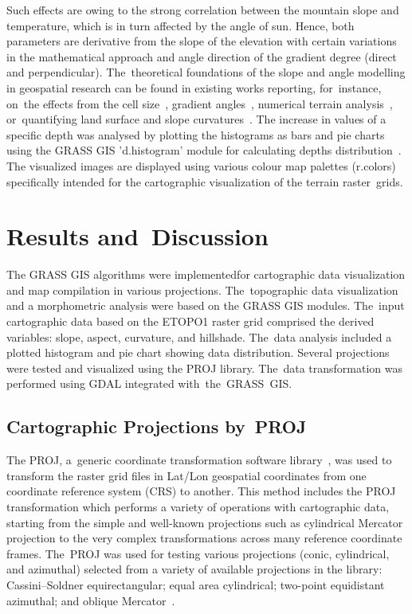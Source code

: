 \documentclass[technologies,article,accept,pdftex,moreauthors]{Definitions/mdpi}
\begin{document}
Such effects are owing to the strong correlation between the mountain slope and temperature, which is in turn affected by the angle of sun. Hence, both parameters are derivative from the slope of the elevation with certain variations in the mathematical approach and angle direction of the gradient degree (direct and perpendicular). The~theoretical foundations of the slope and angle modelling in geospatial research can be found in existing works reporting, for~instance, on~the effects from the cell size~\cite{Hodgson1995}, gradient angles~\cite{Hodgson1998}, numerical terrain analysis~\cite{Zevenbegen}, or~quantifying land surface and slope curvatures~\cite{Dikau,Dunn,Guth,Heerdegan}. {The increase in values of a specific depth} was {analysed} by plotting the histograms as bars and pie charts using the GRASS GIS 'd.histogram' module for calculating depths distribution~\cite{Mitasovaetal1995}. {The visualized }images are displayed using various colour map palettes (r.colors) specifically intended for the cartographic visualization of the terrain raster~grids. 

\section{Results and~Discussion}
{The} GRASS GIS algorithms {were implemented}for cartographic data visualization and map{ compilation} in various projections. The~topographic data visualization and a morphometric analysis were based {on} the {GRASS GIS} modules. The~input cartographic data {based on} the ETOPO1 raster grid {comprised} the derived variables: slope, aspect, curvature, and hillshade. The~data analysis included a plotted histogram and pie chart showing data distribution. Several projections were tested and visualized using the PROJ library. The~data transformation was performed using GDAL integrated \mbox{with the GRASS~GIS}. 

\subsection{{Cartographic} Projections by~PROJ}

{The} PROJ, a~generic coordinate transformation software library~\cite{EversKnudsen}, {was used }to transform the raster grid files in Lat/Lon geospatial coordinates from one coordinate reference system (CRS) to another. This method includes the PROJ transformation which performs a variety of operations with cartographic data, starting from the simple and well-known projections such as cylindrical Mercator projection to the very complex transformations across many reference coordinate frames. The~PROJ was used for testing various projections (conic, cylindrical, %
and azimuthal) selected from a variety of available projections in the library: Cassini--Soldner equirectangular; equal area cylindrical; two-point equidistant azimuthal; and oblique Mercator~\cite{Snyder}. 
\end{document}
